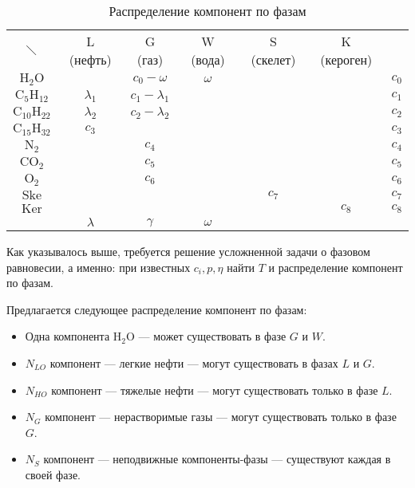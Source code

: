 \documentclass[12pt]{article}
\begin{document}
\begin{table}[ht!]
\centering
\begin{tabular}{c|c|c|c|c|c|c}
\multicolumn{1}{c}{$\diagdown$}&
\multicolumn{1}{c}{L (нефть)}&
\multicolumn{1}{c}{G (газ)}&
\multicolumn{1}{c}{W (вода)}&
\multicolumn{1}{c}{S (скелет)}&
\multicolumn{1}{c}{K (кероген)}&
\multicolumn{1}{c}{}\\
\cline{2-6}
$\mathrm{H_2O}$& & $c_0 - \omega$ & $\omega$ & & & $c_0$\\
\cline{1-6}
$\mathrm{C_5H_{12}}$& $\lambda_1$ & $c_1 - \lambda_1$ & & & & $c_1$\\
\cline{2-6}
$\mathrm{C_{10}H_{22}}$& $\lambda_2$ & $c_2 - \lambda_2$ & & & & $c_2$\\
\cline{1-6}
$\mathrm{C_{15}H_{32}}$& $c_3$ & & & & & $c_3$\\
\cline{1-6}
$\mathrm{N_2}$& & $c_4$ & & & & $c_4$\\
\cline{2-6}
$\mathrm{CO_2}$& & $c_5$ & & & & $c_5$\\
\cline{2-6}
$\mathrm{O_2}$& & $c_6$ & & & & $c_6$\\
\cline{1-6}
$\mathrm{Ske}$& & & & $c_7$ & & $c_7$\\
\cline{2-6}
$\mathrm{Ker}$& & & & & $c_8$ & $c_8$\\
\cline{2-6}
\multicolumn{1}{c}{}&
\multicolumn{1}{c}{$\lambda$}&
\multicolumn{1}{c}{$\gamma$}&
\multicolumn{1}{c}{$\omega$}&
\multicolumn{1}{c}{}\\
\end{tabular}
\caption{Распределение компонент по фазам}
\end{table}

Как указывалось выше, требуется решение усложненной задачи о фазовом равновесии,
а именно: при известных $c_i, p, \eta$ найти $T$ и распределение компонент по
фазам.

Предлагается следующее распределение компонент по фазам:
\begin{itemize}
\item Одна компонента $\mathrm{H_2O}$ --- может существовать в фазе $G$ и $W$.
\item $N_{LO}$ компонент --- легкие нефти --- могут существовать в фазах $L$ и
$G$.
\item $N_{HO}$ компонент --- тяжелые нефти --- могут существовать только в фазе
$L$.
\item $N_{G}$ компонент --- нерастворимые газы --- могут существовать только в
фазе $G$.
\item $N_{S}$ компонент --- неподвижные компоненты-фазы --- существуют каждая в
своей фазе.
\end{itemize}
\end{document}
